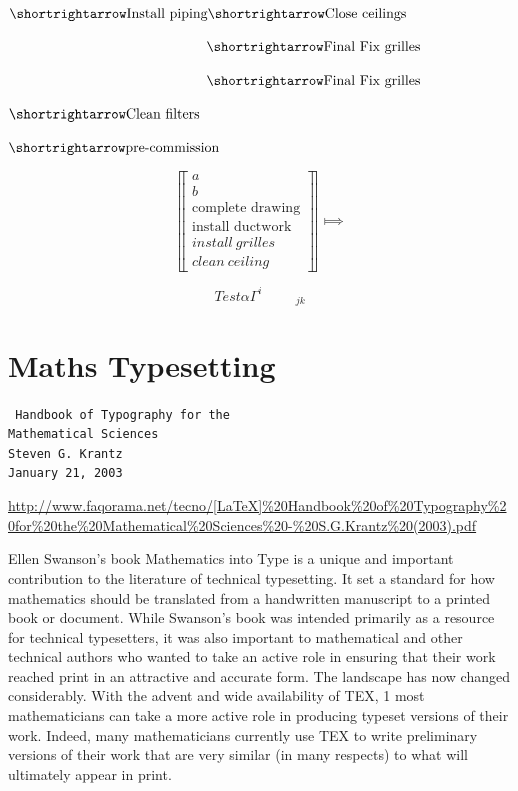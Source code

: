 {%
\def\z{\phantom{\text{install piping}\shortrightarrow}}
$\shortrightarrow\text{Install piping}\shortrightarrow\text{Close ceilings}$


$\phantom{\text{install piping}\shortrightarrow}\shortrightarrow\text{Final Fix grilles}$

$\z\shortrightarrow\text{Final Fix grilles}$

$\shortrightarrow\text{Clean filters}$

$\shortrightarrow\text{pre-commission}$

\[
\left\llbracket \begin{array}{c}a\\b\\ \text{complete drawing}\\ \text{install~ductwork}\\install~ grilles\\clean~ceiling\end{array} \right\rrbracket \Longmapsto
\]



\[
Test \alpha\Gamma^i_{\phantom{iiiiiiiiiii}jk}
\]


\section{Maths Typesetting}

\texttt{
Handbook of Typography for the\\
Mathematical Sciences\\
Steven G. Krantz\\
January 21, 2003}\par

\url{http://www.faqorama.net/tecno/[LaTeX]%20Handbook%20of%20Typography%20for%20the%20Mathematical%20Sciences%20-%20S.G.Krantz%20(2003).pdf}


Ellen Swanson’s book Mathematics into Type is a unique and important contribution to the literature of technical typesetting. It set a
standard for how mathematics should be translated from a handwritten
manuscript to a printed book or document. While Swanson’s book was
intended primarily as a resource for technical typesetters, it was also important to mathematical and other technical authors who wanted to take
an active role in ensuring that their work reached print in an attractive
and accurate form.
The landscape has now changed considerably. With the advent and
wide availability of TEX,
1
most mathematicians can take a more active
role in producing typeset versions of their work. Indeed, many mathematicians currently use TEX to write preliminary versions of their work
that are very similar (in many respects) to what will ultimately appear
in print.

}
